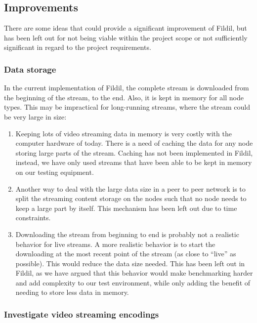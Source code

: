 \documentclass[10pt, a4paper]{article}
\begin{document}
\subsection{Improvements}

There are some ideas that could provide a significant improvement of Fildil, but
has been left out for not being viable within the project scope or not
sufficiently significant in regard to the project requirements.

\subsubsection{Data storage}
\label{sec:storage-improvements}

In the current implementation of Fildil, the complete stream is downloaded from
the beginning of the stream, to the end. Also, it is kept in memory for all node
types. This may be impractical for long-running streams, where the stream could
be very large in size:

\begin{enumerate}
\item Keeping lots of video streaming data in memory is very costly with the
  computer hardware of today. There is a need of caching the data for any node
  storing large parts of the stream. Caching has not been implemented in Fildil,
  instead, we have only used streams that have been able to be kept in memory on
  our testing equipment.
\item Another way to deal with the large data size in a peer to peer network is
  to split the streaming content storage on the nodes such that no node needs to
  keep a large part by itself. This mechanism has been left out due to time
  constraints. %
\item Downloading the stream from beginning to end is probably not a realistic
  behavior for live streams. A more realistic behavior is to start the
  downloading at the most recent point of the stream (as close to ``live'' as
  possible). This would reduce the data size needed. This has been left out in
  Fildil, as we have argued that this behavior would make benchmarking harder
  and add complexity to our test environment, while only adding the benefit of
  needing to store less data in memory.
\end{enumerate}

\subsubsection{Investigate video streaming encodings}
\end{document}
